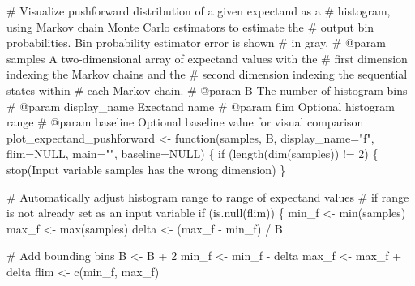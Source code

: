 \documentclass[
  letterpaper,
  DIV=11,
  numbers=noendperiod]{scrartcl}
\newenvironment{Shaded}{\begin{snugshade}}{\end{snugshade}}
\newcommand{\BuiltInTok}[1]{\textcolor[rgb]{0.00,0.23,0.31}{#1}}
\newcommand{\CommentTok}[1]{\textcolor[rgb]{0.37,0.37,0.37}{#1}}
\newcommand{\ControlFlowTok}[1]{\textcolor[rgb]{0.00,0.23,0.31}{#1}}
\newcommand{\DecValTok}[1]{\textcolor[rgb]{0.68,0.00,0.00}{#1}}
\newcommand{\KeywordTok}[1]{\textcolor[rgb]{0.00,0.23,0.31}{#1}}
\newcommand{\NormalTok}[1]{\textcolor[rgb]{0.00,0.23,0.31}{#1}}
\newcommand{\OperatorTok}[1]{\textcolor[rgb]{0.37,0.37,0.37}{#1}}
\newcommand{\StringTok}[1]{\textcolor[rgb]{0.13,0.47,0.30}{#1}}
\begin{document}
\begin{Shaded}
\begin{Highlighting}[]
\CommentTok{\# Visualize pushforward distribution of a given expectand as a }
\CommentTok{\# histogram, using Markov chain Monte Carlo estimators to estimate the }
\CommentTok{\# output bin probabilities.  Bin probability estimator error is shown }
\CommentTok{\# in gray.}
\CommentTok{\# @param samples A two{-}dimensional array of expectand values with the }
\CommentTok{\#                first dimension indexing the Markov chains and the }
\CommentTok{\#                second dimension indexing the sequential states within }
\CommentTok{\#                each Markov chain.}
\CommentTok{\# @param B The number of histogram bins}
\CommentTok{\# @param display\_name Exectand name}
\CommentTok{\# @param flim Optional histogram range}
\CommentTok{\# @param baseline Optional baseline value for visual comparison}
\NormalTok{plot\_expectand\_pushforward }\OperatorTok{\textless{}{-}}\NormalTok{ function(samples, B, display\_name}\OperatorTok{=}\StringTok{"f"}\NormalTok{, }
\NormalTok{                                       flim}\OperatorTok{=}\NormalTok{NULL, main}\OperatorTok{=}\StringTok{""}\NormalTok{, baseline}\OperatorTok{=}\NormalTok{NULL) \{}
  \ControlFlowTok{if}\NormalTok{ (length(dim(samples)) }\OperatorTok{!=} \DecValTok{2}\NormalTok{) \{}
\NormalTok{    stop(}\StringTok{\textquotesingle{}Input variable \textasciigrave{}samples\textasciigrave{} has the wrong dimension\textquotesingle{}}\NormalTok{)}
\NormalTok{  \}}
  
  \CommentTok{\# Automatically adjust histogram range to range of expectand values}
  \CommentTok{\# if range is not already set as an input variable}
  \ControlFlowTok{if}\NormalTok{ (}\KeywordTok{is}\NormalTok{.null(flim)) \{}
\NormalTok{    min\_f }\OperatorTok{\textless{}{-}} \BuiltInTok{min}\NormalTok{(samples)}
\NormalTok{    max\_f }\OperatorTok{\textless{}{-}} \BuiltInTok{max}\NormalTok{(samples)}
\NormalTok{    delta }\OperatorTok{\textless{}{-}}\NormalTok{ (max\_f }\OperatorTok{{-}}\NormalTok{ min\_f) }\OperatorTok{/}\NormalTok{ B}
    
    \CommentTok{\# Add bounding bins}
\NormalTok{    B }\OperatorTok{\textless{}{-}}\NormalTok{ B }\OperatorTok{+} \DecValTok{2}
\NormalTok{    min\_f }\OperatorTok{\textless{}{-}}\NormalTok{ min\_f }\OperatorTok{{-}}\NormalTok{ delta}
\NormalTok{    max\_f }\OperatorTok{\textless{}{-}}\NormalTok{ max\_f }\OperatorTok{+}\NormalTok{ delta}
\NormalTok{    flim }\OperatorTok{\textless{}{-}}\NormalTok{ c(min\_f, max\_f)}
    

\end{Highlighting}
\end{Shaded}
\end{document}
